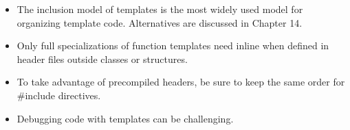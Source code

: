 
\begin{itemize}
\item 
The inclusion model of templates is the most widely used model for organizing template code. Alternatives are discussed in Chapter 14.

\item 
Only full specializations of function templates need inline when defined in header files outside classes or structures.

\item 
To take advantage of precompiled headers, be sure to keep the same order for \#include directives.

\item 
Debugging code with templates can be challenging.
\end{itemize}